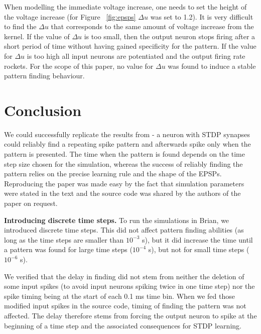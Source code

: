 \documentclass[10pt,a4paper,onecolumn]{article}
\begin{document}
When modelling the immediate voltage increase, one needs to set the
height of the voltage increase (for Figure ~\ref{fig:epsps} \(\Delta u\)
was set to 1.2). It is very difficult to find the \(\Delta u\) that
corresponds to the same amount of voltage increase from the kernel. If
the value of \(\Delta u\) is too small, then the output neuron stops
firing after a short period of time without having gained specificity
for the pattern. If the value for \(\Delta u\) is too high all input
neurons are potentiated and the output firing rate rockets. For the
scope of this paper, no value for \(\Delta u\) was found to induce a
stable pattern finding behaviour.

\section{Conclusion}\label{conclusion}

We could successfully replicate the results from \textcite{Masq2008} - a
neuron with STDP synapses could reliably find a repeating spike pattern
and afterwards spike only when the pattern is presented. The time when
the pattern is found depends on the time step size chosen for the
simulation, whereas the success of reliably finding the pattern relies
on the precise learning rule and the shape of the EPSPs. Reproducing the
paper was made easy by the fact that simulation parameters were stated
in the text and the source code was shared by the authors of the paper
on request.

\textbf{Introducing discrete time steps.} To run the simulations in
Brian, we introduced discrete time steps. This did not affect pattern
finding abilities (as long as the time steps are smaller than
\(10^{-3}\) s), but it did increase the time until a pattern was found
for large time steps (\(10^{-4}\) s), but not for small time steps
(\(10^{-6}\) s).

We verified that the delay in finding did not stem from neither the
deletion of some input spikes (to avoid input neurons spiking twice in
one time step) nor the spike timing being at the start of each 0.1 ms
time bin. When we fed those modified input spikes in the source code,
timing of finding the pattern was not affected. The delay therefore
stems from forcing the output neuron to spike at the beginning of a time
step and the associated consequences for STDP learning.
\end{document}

